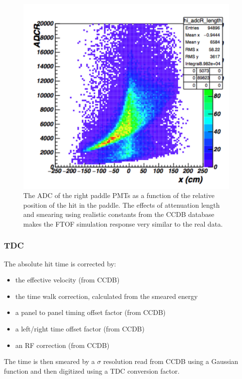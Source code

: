 \begin{figure}
	\centering
	\includegraphics[width=0.95\columnwidth,keepaspectratio]{img/ftofAtten.png}
	\caption{The ADC of the right paddle PMTs as a function of the relative position of the hit in the paddle. The effects of attenuation
				length and smearing using realistic constants from the CCDB database makes the FTOF simulation response very similar to the real data.}
	\label{fig:ftofAtten}
\end{figure}


\subsubsection{TDC}

The absolute hit time is corrected by:

\begin{itemize}
	\item the effective velocity (from CCDB)
	\item the time walk correction, calculated from the smeared energy
	\item a panel to panel timing offset factor (from CCDB)
	\item a left/right time offset factor (from CCDB)
	\item an RF correction (from CCDB)
\end{itemize}

The time is then smeared by a $\sigma$ resolution read from CCDB using a Gaussian function and then digitized using a TDC conversion factor.

